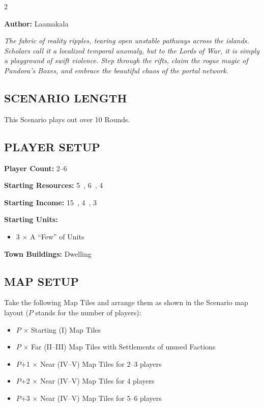 
\begin{multicols*}{2}

\textbf{Author:} Laamakala

\textit{The fabric of reality ripples, tearing open unstable pathways across the islands.
Scholars call it a localized temporal anomaly, but to the Lords of War, it is simply a playground of swift violence.
Step through the rifts, claim the rogue magic of Pandora's Boxes, and embrace the beautiful chaos of the portal network.}

\subsection*{\MakeUppercase{Scenario Length}}
This Scenario plays out over 10 Rounds.

\subsection*{\MakeUppercase{Player Setup}}
\textbf{Player Count:} 2--6

\textbf{Starting Resources:} 5~, 6~, 4~

\textbf{Starting Income:} 15~, 4~, 3~

\textbf{Starting Units:}
\begin{itemize}
  \item 3 × A ``Few'' of  Units
\end{itemize}

\textbf{Town Buildings:}  Dwelling

\subsection*{\MakeUppercase{Map Setup}}

Take the following Map Tiles and arrange them as shown in the Scenario map layout ($P$ stands for the number of players):

\begin{itemize}
  \item $P$ × Starting (I) Map Tiles
  \item $P$ × Far (II--III) Map Tiles with Settlements of unused Factions
  \item $P$+1 × Near (IV--V) Map Tiles for 2--3 players
  \item $P$+2 × Near (IV--V) Map Tiles for 4 players
  \item $P$+3 × Near (IV--V) Map Tiles for 5--6 players
\end{itemize}


\end{multicols*}

